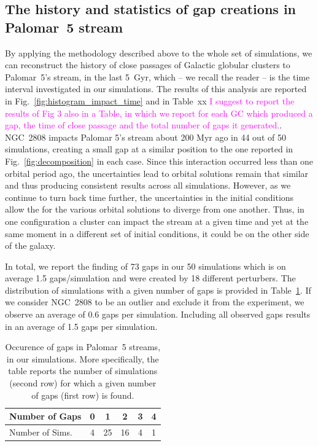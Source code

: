 \documentclass[draft]{aa}
\newcommand{\paola}[1]{\textcolor{magenta}{{#1}}}
\begin{document}
  \subsection{The history and statistics of gap creations in Palomar~5 stream}\label{sect:history}
  

  

    By applying the methodology described above to the whole set of simulations, we can reconstruct the history of close passages of Galactic globular clusters to Palomar~5's stream, in the last 5~Gyr, which -- we recall the reader -- is the time interval investigated in our simulations. The results of this analysis are reported in Fig.~\ref{fig:histogram_impact_time} and in Table~xx \paola{I suggest to report the results of Fig 3 also in a Table, in which we report for each GC which produced a gap, the time of close passage and the total number of gaps it generated.}. NGC~2808 impacts Palomar 5's stream about 200 Myr ago in 44 out of 50 simulations, creating a small gap at a similar position to the one reported in Fig.~\ref{fig:decomposition} in each case. Since this interaction occurred less than one orbital period ago, the uncertainties lead to orbital solutions remain that similar and thus producing consistent results across all simulations. However, as we continue to turn back time further, the uncertainties in the initial conditions allow the for the various orbital solutions to diverge from one another. Thus, in one configuration a cluster can impact the stream at a given time and yet at the same moment in a different set of initial conditions, it could be on the other side of the galaxy.
    
    
    In total, we report the finding of 73 gaps in our 50 simulations which is on average 1.5 gaps/simulation and were created by 18 different perturbers. The distribution of simulations with a given number of gaps is provided in Table~\ref{table:gap_distribution}.  If we consider NGC~2808 to be an outlier and exclude it from the experiment, we observe an average of 0.6 gaps per simulation. Including all observed gaps results in an average of 1.5 gaps per simulation. 
    
    \begin{table}[h]
      \centering
        \begin{tabular}{|l|c|c|c|c|c|}
          \hline
          Number of Gaps & 0 & 1 & 2 & 3 & 4 \\
          \hline
          Number of Sims. & 4 & 25 & 16 & 4 & 1 \\
          \hline
        \end{tabular}
        \vspace{0.5cm}
      \caption{Occurence of gaps in Palomar~5 streams,  in our simulations. More specifically, the table reports the number of simulations (second row) for which a given number of gaps (first row) is found. }\label{table:gap_distribution}
    \end{table}
\end{document}
